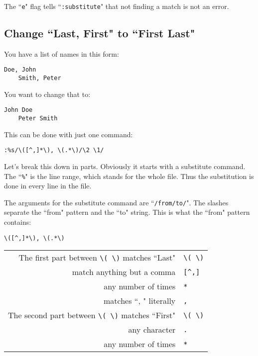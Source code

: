 The ``\texttt{e}" flag tells ``\texttt{:substitute}" that not finding a match is not an error.
\subsection{Change ``Last, First" to ``First Last"}
You have a list of names in this form:

\begin{Verbatim}[samepage=true]
    Doe, John
    Smith, Peter
\end{Verbatim}

You want to change that to:

\begin{Verbatim}[samepage=true]
    John Doe
    Peter Smith
\end{Verbatim}

This can be done with just one command:

\begin{Verbatim}[samepage=true]
 :%s/\([^,]*\), \(.*\)/\2 \1/
\end{Verbatim}

Let's break this down in parts.
Obviously it starts with a substitute command.
The ``\texttt{\%}" is the line range, which stands for the whole file.
Thus the substitution is done in every line in the file.

The arguments for the substitute command are ``\texttt{/from/to/}".
The slashes separate the ``from" pattern and the ``to" string.
This is what the ``from" pattern contains:

\begin{Verbatim}[samepage=true]
	\([^,]*\), \(.*\)
\end{Verbatim}

\begin{center}
				\begin{longtable}{r l}
								The first part between \texttt{\textbackslash{}( \textbackslash{})} matches ``Last" & \texttt{\textbackslash{}( \textbackslash{})} \\
								match anything but a comma & \texttt{[\^{},]} \\
								any number of times & \texttt{*} \\
								matches ``, " literally & \texttt{,} \\
								The second part between \texttt{\textbackslash{}( \textbackslash{})} matches ``First" & \texttt{\textbackslash{}(  \textbackslash{})} \\
								any character & \texttt{.} \\
								any number of times & \texttt{*} \\
				\end{longtable}
\end{center}

